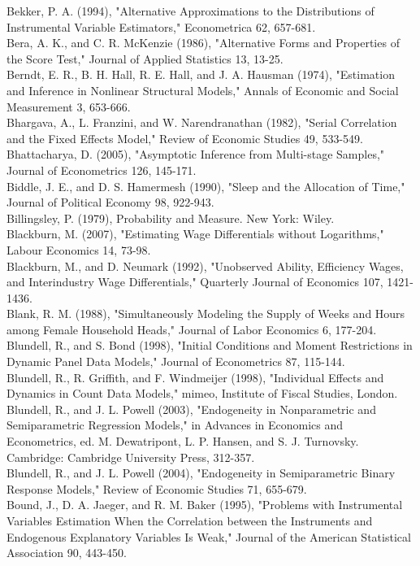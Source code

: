 \documentclass[10pt]{article}
\begin{document}
Bekker, P. A. (1994), "Alternative Approximations to the Distributions of Instrumental Variable Estimators," Econometrica 62, 657-681.\\
Bera, A. K., and C. R. McKenzie (1986), "Alternative Forms and Properties of the Score Test," Journal of Applied Statistics 13, 13-25.\\
Berndt, E. R., B. H. Hall, R. E. Hall, and J. A. Hausman (1974), "Estimation and Inference in Nonlinear Structural Models," Annals of Economic and Social Measurement 3, 653-666.\\
Bhargava, A., L. Franzini, and W. Narendranathan (1982), "Serial Correlation and the Fixed Effects Model," Review of Economic Studies 49, 533-549.\\
Bhattacharya, D. (2005), "Asymptotic Inference from Multi-stage Samples," Journal of Econometrics 126, 145-171.\\
Biddle, J. E., and D. S. Hamermesh (1990), "Sleep and the Allocation of Time," Journal of Political Economy 98, 922-943.\\
Billingsley, P. (1979), Probability and Measure. New York: Wiley.\\
Blackburn, M. (2007), "Estimating Wage Differentials without Logarithms," Labour Economics 14, 73-98.\\
Blackburn, M., and D. Neumark (1992), "Unobserved Ability, Efficiency Wages, and Interindustry Wage Differentials," Quarterly Journal of Economics 107, 1421-1436.\\
Blank, R. M. (1988), "Simultaneously Modeling the Supply of Weeks and Hours among Female Household Heads," Journal of Labor Economics 6, 177-204.\\
Blundell, R., and S. Bond (1998), "Initial Conditions and Moment Restrictions in Dynamic Panel Data Models," Journal of Econometrics 87, 115-144.\\
Blundell, R., R. Griffith, and F. Windmeijer (1998), "Individual Effects and Dynamics in Count Data Models," mimeo, Institute of Fiscal Studies, London.\\
Blundell, R., and J. L. Powell (2003), "Endogeneity in Nonparametric and Semiparametric Regression Models," in Advances in Economics and Econometrics, ed. M. Dewatripont, L. P. Hansen, and S. J. Turnovsky. Cambridge: Cambridge University Press, 312-357.\\
Blundell, R., and J. L. Powell (2004), "Endogeneity in Semiparametric Binary Response Models," Review of Economic Studies 71, 655-679.\\
Bound, J., D. A. Jaeger, and R. M. Baker (1995), "Problems with Instrumental Variables Estimation When the Correlation between the Instruments and Endogenous Explanatory Variables Is Weak," Journal of the American Statistical Association 90, 443-450.\\
\end{document}
